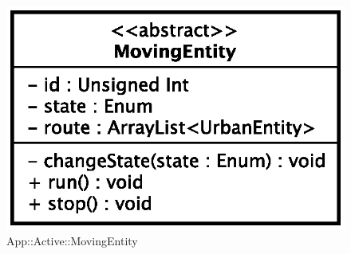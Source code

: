\begin{figure}[h]
\centering
\includegraphics[scale=0.6,keepaspectratio]{images/solution/moving_entity.eps}
\caption{App::Active::MovingEntity}
\label{fig:sd-app-movingentity}
\end{figure}
